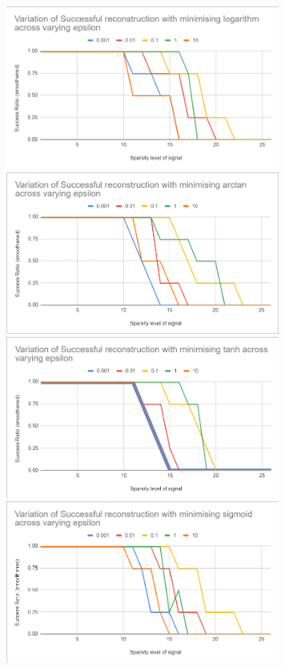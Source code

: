 \documentclass[a4paper,14pt]{article}
\numberwithin{definition}{section}
\numberwithin{mytheorem}{subsection}
\begin{document}
\begin{center}
    \includegraphics[width=9cm]{log_epsilon.png}
    \includegraphics[width=9cm]{atan_epsilon.png}
    \includegraphics[width=9cm]{tanh_epsilon.png}
    \includegraphics[width=9cm]{sigmoid_epsilon.png}
\end{center}
\end{document}
